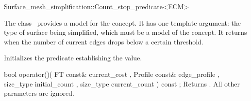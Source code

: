 

\begin{ccRefClass}{Surface_mesh_simplification::Count_stop_predicate<ECM>}


\ccDefinition

The class \ccRefName\ provides a model for the  concept.
It has one template argument: the type of surface being simplified,
which must be a model of the  concept.
It returns  when the number of current edges drops below a certain threshold.


\ccIsModel
{}

\ccCreation
{}  %

{Initializes the predicate establishing the  value.} 

\ccOperations

  \ccMemberFunction
    {bool operator()( FT const&      current_cost
                    , Profile const& edge_profile
                    , size_type      initial_count
                    , size_type      current_count
                    ) const ;
           }
  {Returns . All other parameters are ignored.}

\ccSeeAlso
{}

\end{ccRefClass}


